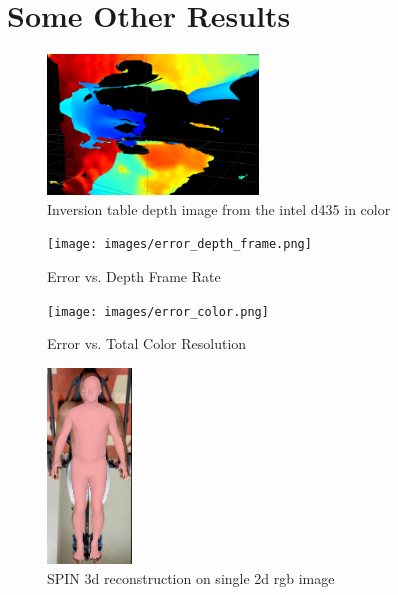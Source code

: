 
\chapter{Some Other Results}

\begin{figure}[h]
        \caption{Inversion table depth image from the intel d435 in color}
        \centering
        \includegraphics[width=0.5\textwidth]{images/inversion_depth.png}
\end{figure}
 
\begin{figure}[h]
        \caption{Error vs. Depth Frame Rate}
        \centering
        \texttt{[image: images/error\_depth\_frame.png]}
\end{figure}
 
\begin{figure}[h]
        \caption{Error vs. Total Color Resolution}
        \centering
        \texttt{[image: images/error\_color.png]}
\end{figure}
 

\begin{figure}[h]
        \caption{SPIN 3d reconstruction on single 2d rgb image}
        \centering
        \includegraphics[width=0.2\textwidth]{images/spin.png}
\end{figure}


